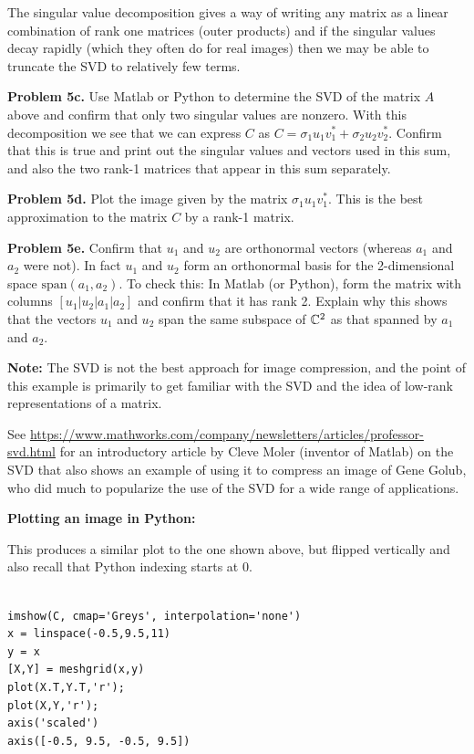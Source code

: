 \documentclass[10pt]{article}
\begin{document}
The singular value decomposition gives a way of writing any matrix 
as a linear combination of rank one matrices (outer products) and if the
singular values decay rapidly (which they often do for real images) then we
may be able to truncate the SVD to relatively few terms. 

{\bf Problem 5c.} Use Matlab or Python to determine the SVD of the matrix $A$ above
and confirm that only two singular values are nonzero.  With this
decomposition we see that we can express $C$ as $C = \sigma_1 u_1v_1^* +
\sigma_2 u_2 v_2^*$.  Confirm that this is true and print out the singular
values and vectors used in this sum, and also the two
rank-1 matrices that appear in this sum separately.  

{\bf Problem 5d.} Plot the image given by the matrix $\sigma_1 u_1v_1^*$.  This is
the best approximation to the matrix $C$ by a rank-1 matrix.  

{\bf Problem 5e.} Confirm that $u_1$ and $u_2$ are orthonormal vectors
(whereas $a_1$ and $a_2$ were not).  In fact $u_1$ and $u_2$ form an
orthonormal basis for the 2-dimensional space $\text{span}(a_1,a_2)$.
To check this: In Matlab (or Python), form the matrix 
with columns $[u_1 | u_2 | a_1 | a_2]$ and confirm that it has rank 2.
Explain why this shows that the vectors $u_1$ and $u_2$ span the same
subspace of $\mathbb{C}^2$ as that spanned by $a_1$ and $a_2$.

\vskip 5pt
{\bf Note:} The SVD is not the best approach for image compression,
and the point of this example is primarily to get familiar with the
SVD and the idea of low-rank representations of a matrix.

See
\url{https://www.mathworks.com/company/newsletters/articles/professor-svd.html}
for an introductory article by Cleve Moler (inventor of Matlab) on
the SVD that also shows an example of using it to compress an image
of Gene Golub, who did much to popularize the use of the SVD for a
wide range of applications.  

\vskip 1cm
{\bf Plotting an image in Python:}

This produces a similar plot to the one shown above, but flipped vertically
and also recall that Python indexing starts at 0.

\begin{verbatim}

imshow(C, cmap='Greys', interpolation='none')
x = linspace(-0.5,9.5,11)
y = x
[X,Y] = meshgrid(x,y)
plot(X.T,Y.T,'r');
plot(X,Y,'r');
axis('scaled')
axis([-0.5, 9.5, -0.5, 9.5])
\end{verbatim} 
\end{document}
